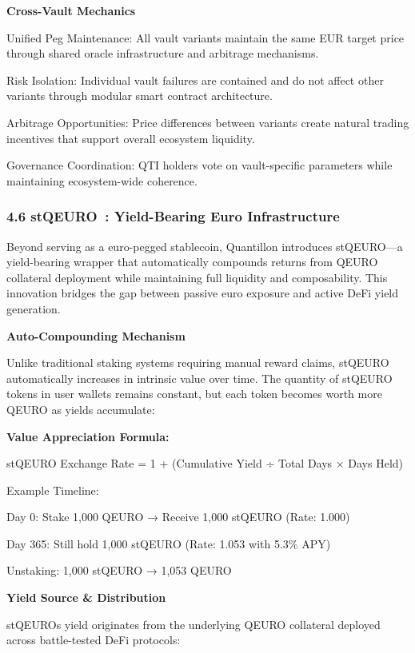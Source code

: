 \textbf{Cross-Vault Mechanics}

Unified Peg Maintenance: All vault variants maintain the same EUR target
price through shared oracle infrastructure and arbitrage mechanisms.

Risk Isolation: Individual vault failures are contained and do not
affect other variants through modular smart contract architecture.

Arbitrage Opportunities: Price differences between variants create
natural trading incentives that support overall ecosystem liquidity.

Governance Coordination: QTI holders vote on vault-specific parameters
while maintaining ecosystem-wide coherence.

\hypertarget{stqeuro-yield-bearing-euro-infrastructure}{%
\subsubsection{4.6 stQEURO~: Yield-Bearing Euro
Infrastructure}\label{stqeuro-yield-bearing-euro-infrastructure}}

Beyond serving as a euro-pegged stablecoin, Quantillon introduces
stQEURO---a yield-bearing wrapper that automatically compounds returns
from QEURO collateral deployment while maintaining full liquidity and
composability. This innovation bridges the gap between passive euro
exposure and active DeFi yield generation.

\textbf{Auto-Compounding Mechanism}

Unlike traditional staking systems requiring manual reward claims,
stQEURO automatically increases in intrinsic value over time. The
quantity of stQEURO tokens in user wallets remains constant, but each
token becomes worth more QEURO as yields accumulate:

\textbf{Value Appreciation Formula:}

stQEURO Exchange Rate = 1 + (Cumulative Yield ÷ Total Days × Days Held)

Example Timeline:

Day 0: Stake 1,000 QEURO → Receive 1,000 stQEURO (Rate: 1.000)

Day 365: Still hold 1,000 stQEURO (Rate: 1.053 with 5.3\% APY)

Unstaking: 1,000 stQEURO → 1,053 QEURO

\textbf{Yield Source \& Distribution}

stQEURO\textquotesingle s yield originates from the underlying QEURO
collateral deployed across battle-tested DeFi protocols:

